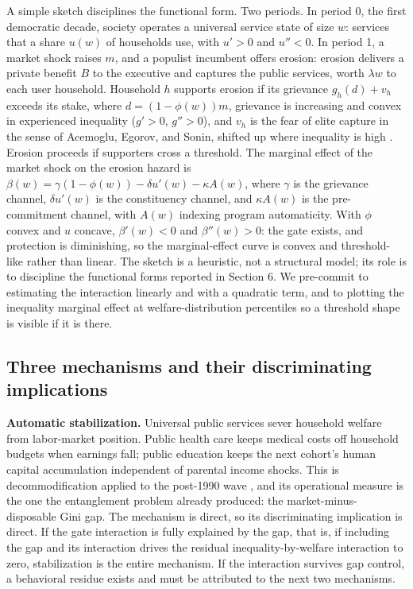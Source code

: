 A simple sketch disciplines the functional form. Two periods. In period 0, the first democratic decade, society operates a universal service state of size $w$: services that a share $u(w)$ of households use, with $u' > 0$ and $u'' < 0$. In period 1, a market shock raises $m$, and a populist incumbent offers erosion: erosion delivers a private benefit $B$ to the executive and captures the public services, worth $\lambda w$ to each user household. Household $h$ supports erosion if its grievance $g_h(d) + v_h$ exceeds its stake, where $d = (1 - \phi(w)) m$, grievance is increasing and convex in experienced inequality ($g' > 0$, $g'' > 0$), and $v_h$ is the fear of elite capture in the sense of Acemoglu, Egorov, and Sonin, shifted up where inequality is high \citep{AcemogluEgorov2013}. Erosion proceeds if supporters cross a threshold. The marginal effect of the market shock on the erosion hazard is $\beta(w) = \gamma(1 - \phi(w)) - \delta u'(w) - \kappa A(w)$, where $\gamma$ is the grievance channel, $\delta u'(w)$ is the constituency channel, and $\kappa A(w)$ is the pre-commitment channel, with $A(w)$ indexing program automaticity. With $\phi$ convex and $u$ concave, $\beta'(w) < 0$ and $\beta''(w) > 0$: the gate exists, and protection is diminishing, so the marginal-effect curve is convex and threshold-like rather than linear. The sketch is a heuristic, not a structural model; its role is to discipline the functional forms reported in Section 6. We pre-commit to estimating the interaction linearly and with a quadratic term, and to plotting the inequality marginal effect at welfare-distribution percentiles so a threshold shape is visible if it is there.

\subsection{Three mechanisms and their discriminating implications}

\textbf{Automatic stabilization.} Universal public services sever household welfare from labor-market position. Public health care keeps medical costs off household budgets when earnings fall; public education keeps the next cohort's human capital accumulation independent of parental income shocks. This is decommodification applied to the post-1990 wave \citep{EspingAndersen1990}, and its operational measure is the one the entanglement problem already produced: the market-minus-disposable Gini gap. The mechanism is direct, so its discriminating implication is direct. If the gate interaction is fully explained by the gap, that is, if including the gap and its interaction drives the residual inequality-by-welfare interaction to zero, stabilization is the entire mechanism. If the interaction survives gap control, a behavioral residue exists and must be attributed to the next two mechanisms.

